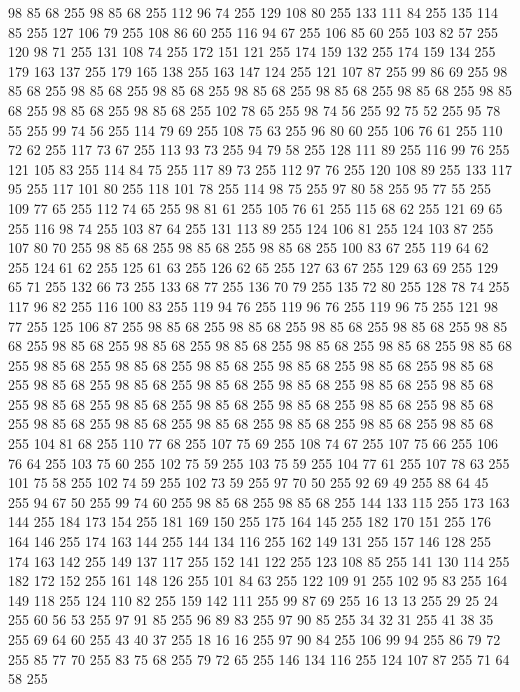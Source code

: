 98 85 68 255 98 85 68 255 112 96 74 255 129 108 80 255 133 111 84 255 135 114 85 255 127 106 79 255 108 86 60 255 116 94 67 255 106 85 60 255 103 82 57 255 120 98 71 255 131 108 74 255 172 151 121 255 174 159 132 255 174 159 134 255 179 163 137 255 179 165 138 255 163 147 124 255 121 107 87 255 99 86 69 255 98 85 68 255 98 85 68 255 98 85 68 255 98 85 68 255 98 85 68 255 98 85 68 255 98 85 68 255 98 85 68 255 98 85 68 255 102 78 65 255 98 74 56 255 92 75 52 255 95 78 55 255 99 74 56 255 114 79 69 255 108 75 63 255 96 80 60 255 106 76 61 255 110 72 62 255 117 73 67 255 113 93 73 255 94 79 58 255 128 111 89 255 116 99 76 255 121 105 83 255 114 84 75 255 117 89 73 255 112 97 76 255 120 108 89 255 133 117 95 255 117 101 80 255 118 101 78 255 114 98 75 255 97 80 58 255 95 77 55 255 109 77 65 255 112 74 65 255 98 81 61 255 105 76 61 255 115 68 62 255 121 69 65 255 116 98 74 255 103 87 64 255
131 113 89 255 124 106 81 255 124 103 87 255 107 80 70 255 98 85 68 255 98 85 68 255 98 85 68 255 100 83 67 255 119 64 62 255 124 61 62 255 125 61 63 255 126 62 65 255 127 63 67 255 129 63 69 255 129 65 71 255 132 66 73 255 133 68 77 255 136 70 79 255 135 72 80 255 128 78 74 255 117 96 82 255 116 100 83 255 119 94 76 255 119 96 76 255 119 96 75 255 121 98 77 255 125 106 87 255 98 85 68 255 98 85 68 255 98 85 68 255 98 85 68 255 98 85 68 255 98 85 68 255 98 85 68 255 98 85 68 255 98 85 68 255 98 85 68 255 98 85 68 255 98 85 68 255 98 85 68 255 98 85 68 255 98 85 68 255 98 85 68 255 98 85 68 255 98 85 68 255 98 85 68 255 98 85 68 255 98 85 68 255 98 85 68 255 98 85 68 255 98 85 68 255 98 85 68 255 98 85 68 255 98 85 68 255 98 85 68 255 98 85 68 255 98 85 68 255 98 85 68 255 98 85 68 255 98 85 68 255 98 85 68 255 98 85 68 255 104 81 68 255 110 77 68 255
107 75 69 255 108 74 67 255 107 75 66 255 106 76 64 255 103 75 60 255 102 75 59 255 103 75 59 255 104 77 61 255 107 78 63 255 101 75 58 255 102 74 59 255 102 73 59 255 97 70 50 255 92 69 49 255 88 64 45 255 94 67 50 255 99 74 60 255 98 85 68 255 98 85 68 255 144 133 115 255 173 163 144 255 184 173 154 255 181 169 150 255 175 164 145 255 182 170 151 255 176 164 146 255 174 163 144 255 144 134 116 255 162 149 131 255 157 146 128 255 174 163 142 255 149 137 117 255 152 141 122 255 123 108 85 255 141 130 114 255 182 172 152 255 161 148 126 255 101 84 63 255 122 109 91 255 102 95 83 255 164 149 118 255 124 110 82 255 159 142 111 255 99 87 69 255 16 13 13 255 29 25 24 255 60 56 53 255 97 91 85 255 96 89 83 255 97 90 85 255 34 32 31 255 41 38 35 255 69 64 60 255 43 40 37 255 18 16 16 255 97 90 84 255 106 99 94 255 86 79 72 255 85 77 70 255 83 75 68 255 79 72 65 255 146 134 116 255 124 107 87 255 71 64 58 255
